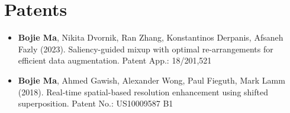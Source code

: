 \section*{Patents}
    \vspace{\postsubhead}
    \begin{adjustwidth}{\indentleft}{\indentright}
    \begin{itemize}
        \setlength\itemsep{0.5em}
        \item \textbf{Bojie Ma}, Nikita Dvornik, Ran Zhang, Konstantinos Derpanis, Afsaneh Fazly (2023). Saliency-guided mixup with optimal re-arrangements for efficient data augmentation. Patent App.: 18/201,521
        \item \textbf{Bojie Ma}, Ahmed Gawish, Alexander Wong, Paul Fieguth, Mark Lamm (2018). Real-time spatial-based resolution enhancement using shifted superposition. Patent No.: US10009587 B1
      \end{itemize}
    \end{adjustwidth}
    \vspace{\postsection}